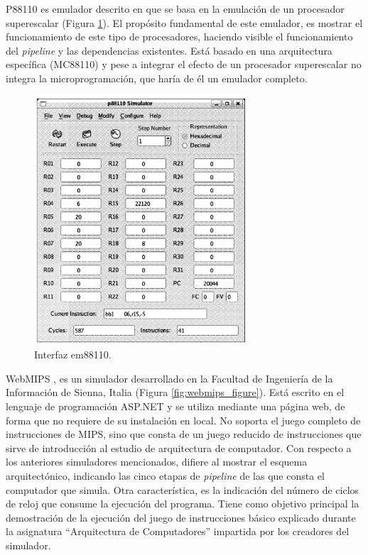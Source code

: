 P88110 es emulador descrito en \cite{garcia2009p88110} que se basa en la emulación de un procesador superescalar (Figura \ref{fig:p88110_figure}). El propósito fundamental de este emulador, es mostrar el funcionamiento de este tipo de procesadores, haciendo visible el funcionamiento del \emph{pipeline} y las dependencias existentes. Está basado en una arquitectura específica (MC88110) y pese a integrar el efecto de un procesador superescalar no integra la microprogramación, que haría de él un emulador completo.

\begin{figure}[htbp]
 	\centering
 	\includegraphics[width=8cm]{figures/em88110}
 	\caption{Interfaz em88110.}
	\label{fig:p88110_figure}
\end{figure}


WebMIPS \cite{branovic2004webmips}, es un simulador desarrollado en la Facultad de Ingeniería de la Información de Sienna, Italia (Figura \ref{fig:webmips_figure}). Está escrito en el lenguaje de programación ASP.NET y se utiliza mediante una página web, de forma que no requiere de su instalación en local. No soporta el juego completo de instrucciones de MIPS, sino que consta de un juego reducido de instrucciones que sirve de introducción al estudio de arquitectura de computador. Con respecto a los anteriores simuladores mencionados, difiere al mostrar el esquema arquitectónico, indicando las cinco etapas de \emph{pipeline} de las que consta el computador que simula. Otra característica, es la indicación del número de ciclos de reloj que consume la ejecución del programa. Tiene como objetivo principal la demostración de la ejecución del juego de instrucciones básico explicado durante la asignatura ``Arquitectura de Computadores'' impartida por los creadores del simulador.

